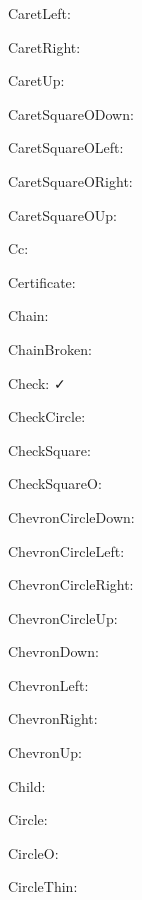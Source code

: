 \documentclass{article}
\begin{document}
      CaretLeft: \faCaretLeft\ 

      CaretRight: \faCaretRight\ 

      CaretUp: \faCaretUp\ 

      CaretSquareODown: \faCaretSquareODown\ 

      CaretSquareOLeft: \faCaretSquareOLeft\ 

      CaretSquareORight: \faCaretSquareORight\ 

      CaretSquareOUp: \faCaretSquareOUp\ 

      Cc: \faCc\ 

      Certificate: \faCertificate\ 

      Chain: \faChain\ 

      ChainBroken: \faChainBroken\ 

      Check: \faCheck\ 

      CheckCircle: \faCheckCircle\ 

      CheckSquare: \faCheckSquare\ 

      CheckSquareO: \faCheckSquareO\ 

      ChevronCircleDown: \faChevronCircleDown\ 

      ChevronCircleLeft: \faChevronCircleLeft\ 

      ChevronCircleRight: \faChevronCircleRight\ 

      ChevronCircleUp: \faChevronCircleUp\ 

      ChevronDown: \faChevronDown\ 

      ChevronLeft: \faChevronLeft\ 

      ChevronRight: \faChevronRight\ 

      ChevronUp: \faChevronUp\ 

      Child: \faChild\ 

      Circle: \faCircle\ 

      CircleO: \faCircleO\ 

      CircleThin: \faCircleThin\ 
\end{document}
